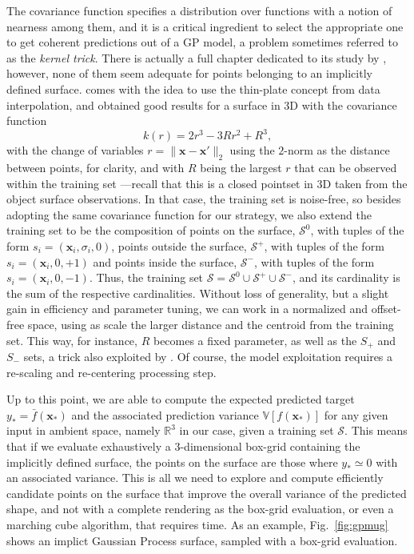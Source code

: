 The covariance function specifies a distribution over functions with a notion of nearness among them, and it is a critical ingredient to select the appropriate one to get coherent predictions out of a GP model, a problem sometimes referred to as the \emph{kernel trick}. There is actually a full chapter dedicated to its study by \citet[see Ch. 4]{Rasmussen2006Gaussian}, however, none of them seem adequate for points belonging to an implicitly defined surface. \citet{Williams2007Gaussian} comes with the idea to use the thin-plate concept from data interpolation, and obtained good results for a surface in 3D with the covariance function
\begin{equation}
k(r) = 2r^{3} - 3Rr^2 + R^3,
\end{equation}
with the change of variables $r = \| \mathbf{x} - \mathbf{x}' \|_2$ using the $2$-norm as the distance between points, for clarity, and with $R$ being the largest $r$ that can be observed within the training set ---recall that this is a closed pointset in 3D taken from the object surface observations. In that case, the training set is noise-free, so besides adopting the same covariance function for our strategy, we also extend the training set to be the composition of points on the surface, $\mathcal{S}^0$, with tuples of the form $s_i = (\mathbf{x}_i, \sigma_i, 0)$, points outside the surface, $\mathcal{S}^+$, with tuples of the form $s_i = (\mathbf{x}_i, 0, +1)$ and points inside the surface, $\mathcal{S}^-$, with tuples of the form $s_i = (\mathbf{x}_i, 0, -1)$. Thus, the training set $\mathcal{S} = \mathcal{S}^0 \cup \mathcal{S}^+ \cup \mathcal{S}^-$, and its cardinality is the sum of the respective cardinalities. Without loss of generality, but a slight gain in efficiency and parameter tuning, we can work in a normalized and offset-free space, using as scale the larger distance and the centroid from the training set. This way, for instance, $R$ becomes a fixed parameter, as well as the $S_+$ and $S_-$ sets, a trick also exploited by \citet{Li2016Dexterous}. Of course, the model exploitation requires a re-scaling and re-centering processing step.

Up to this point, we are able to compute the expected predicted target $y_* = \bar{f}(\mathbf{x}_*)$ and the associated prediction variance $\mathbb{V}[f(\mathbf{x}_*)]$ for any given input in ambient space, namely $\mathbb{R}^3$ in our case, given a training set $\mathcal{S}$. This means that if we evaluate exhaustively a $3$-dimensional box-grid containing the implicitly defined surface, the points on the surface are those where $y_* \simeq 0$ with an associated variance. This is all we need to explore and compute efficiently candidate points on the surface that improve the overall variance of the predicted shape, and not with a complete rendering as the box-grid evaluation, or even a marching cube algorithm, that requires time.
As an example, Fig.~\ref{fig:gpmug} shows an implict Gaussian Process surface, sampled with a box-grid evaluation.

